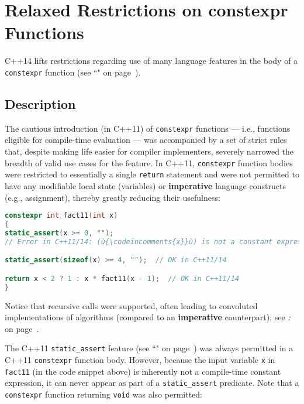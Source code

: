 \newpage
\section[{\tt constexpr} Functions '14]{Relaxed Restrictions on {\SecCode constexpr} Functions}\label{relaxed-constexpr-restrictions}%

C++14 lifts restrictions regarding use of many language features in the
body of a \texttt{constexpr} function (see ``" on page~\pageref{constexprfunc}).

\subsection[Description]{Description}\label{description}

The cautious introduction (in C++11) of \texttt{constexpr}
functions --- i.e., functions eligible for compile-time evaluation
--- was accompanied by a set of strict rules that, despite making life
easier for compiler implementers, severely narrowed the breadth of valid
use cases for the feature. In C++11, \texttt{constexpr}
function bodies were restricted to essentially a single
\texttt{return} statement and were not permitted to have any modifiable
local state (variables) or \textbf{imperative} language constructs
(e.g., assignment), thereby greatly reducing their \mbox{usefulness}:

\begin{lstlisting}[language=C++]
constexpr int fact11(int x)
{
static_assert(x >= 0, "");
// Error in C++11/14: (ù{\codeincomments{x}}ù) is not a constant expression.

static_assert(sizeof(x) >= 4, "");  // OK in C++11/14

return x < 2 ? 1 : x * fact11(x - 1);  // OK in C++11/14
}
\end{lstlisting}

\noindent Notice that recursive calls were supported, often leading to convoluted
implementations of algorithms (compared to an \textbf{imperative}
counterpart); see \textit{: } on page~\pageref{non-recursive-constexpr-algorithms}.

The C++11 \texttt{static\_assert} feature (see ``" on page~\pageref{compile-time-assertions-(static_assert)}) was always
permitted in a C++11 \texttt{constexpr} function body.
However, because the input variable \texttt{x} in \texttt{fact11}
(in the code snippet above) is inherently not a compile-time constant expression, it can
never appear as part of a \texttt{static\_assert} predicate. Note that a
\texttt{constexpr} function returning \texttt{void} was also permitted:

